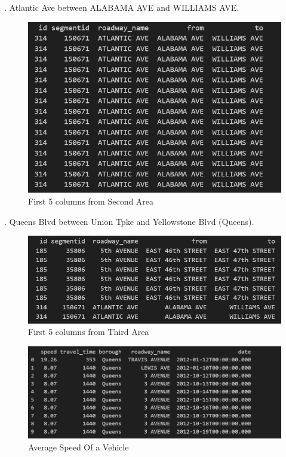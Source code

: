 . Atlantic Ave between ALABAMA AVE and WILLIAMS AVE.
\newline
\begin{figure}[h]
    \centering
    \includegraphics[width=1\linewidth]{figures/area-2.PNG}
    \caption{First 5 columns from Second Area}
    \label{fig:Data From Selected Area}
\end{figure}
. Queens Blvd between Union Tpke and Yellowstone Blvd (Queens).
\newline
\begin{figure}[h]
    \centering
    \includegraphics[width=1\linewidth]{figures/area-3.PNG}
    \caption{First 5 columns from Third Area}
    \label{fig:Data From Selected Area}
\end{figure}
\newline
\newline
\begin{figure}[h]
    \centering
    \includegraphics[width=1\linewidth]{figures/data_from_selected_area.PNG}
    \caption{Average Speed Of a Vehicle}
    \label{fig:Data From Selected Area}
\end{figure}
